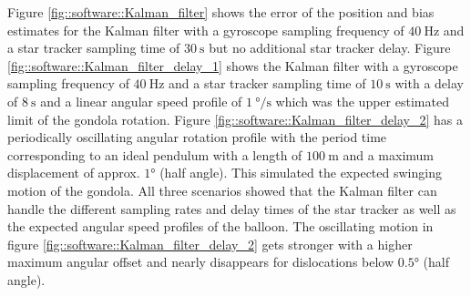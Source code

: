 Figure \mbox{\ref{fig::software::Kalman_filter}} shows the error of the position and bias estimates for the Kalman filter with a gyroscope sampling frequency of $\SI{40}{\Hz}$ and a star tracker sampling time of $\SI{30}{\second}$ but no additional star tracker delay. Figure \mbox{\ref{fig::software::Kalman_filter_delay_1}} shows the Kalman filter with a gyroscope sampling frequency of $\SI{40}{\Hz}$ and a star tracker sampling time of $\SI{10}{\second}$ with a delay of $\SI{8}{\s}$ and a linear angular speed profile of $\SI{1}{\degree\per\s}$ which was the upper estimated limit of the gondola rotation. Figure \mbox{\ref{fig::software::Kalman_filter_delay_2}} has a periodically oscillating angular rotation profile with the period time corresponding to an ideal pendulum with a length of $\SI{100}{\m}$ and a maximum displacement of approx. $\ang{1}$ (half angle). This simulated the expected swinging motion of the gondola. All three scenarios showed that the Kalman filter can handle the different sampling rates and delay times of the star tracker as well as the expected angular speed profiles of the balloon. The oscillating motion in figure \mbox{\ref{fig::software::Kalman_filter_delay_2}} gets stronger with a higher maximum angular offset and nearly disappears for dislocations below $\ang{0.5}$ (half angle).

